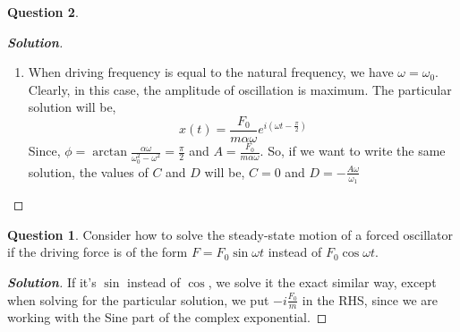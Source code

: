 \documentclass[10pt]{scrartcl}
\theoremstyle{definition}
\newtheorem{exercise}{Question}
\newenvironment{solution} {\begin{proof}[\normalfont \textbf{Solution}]} {\end{proof}}
\begin{document}
\begin{exercise}
\begin{solution}
\begin{enumerate}[label={(\alph*)}]
                Since the RHS is $\frac{F_0}{m}\cos\omega t$, we take a guess that $x(t)$ is of the form $x = Ae^{i\omega t}$.
                Then, putting this value in the equation we get, 
                \begin{align*}
                    &A[-\omega^2 -i\alpha \omega + \omega_0^2] = \frac{F_0}{m} \\ 
                    \Rightarrow &A = \frac{F_0}{m} \cdot \frac{1}{i\alpha\omega + (\omega_0^2 - \omega^2)} \\ 
                    \Rightarrow &A = \frac{F_0}{m} \cdot \frac{1}{\sqrt{\alpha^2\omega^2 + (\omega_0^2 - \omega^2)^2} e^{i\phi}}
                \end{align*}
                Where $\phi = \arctan{\left(\frac{\alpha \omega }{\omega_0^2 - \omega^2}\right)}$
                Hence, the solution is
                $$\boxed{x(t) =e^{-\frac{\alpha t}{2}}(C\cos\omega_1t + D\sin\omega_1t) + A\cos{\left(\omega t - \phi\right)}}$$
                Putting the initial values in the problem we get, $\boxed{C = -A\cos\phi}$ and 
                \begin{align*}
                    &-\frac{\alpha}{2}C + \omega_1 D + \omega A \sin \phi = 0 \\ 
                    \Rightarrow &\omega_1D = -A\left(\omega\sin\phi + \frac{\alpha}{2}\cos\phi\right) \\ 
                    \Rightarrow &\boxed{D = -\frac{A}{\omega_1}\left(\omega\sin\phi + \frac{\alpha}{2}\cos\phi\right)}
                \end{align*}
                This determines $x(t)$ uniquely.
            \item When driving frequency is equal to the natural frequency, we have $\omega = \omega_0$. Clearly, in this case, the amplitude of oscillation is maximum. The particular solution will be, 
                $$\boxed{x(t) = \frac{F_0}{m \alpha \omega} e^{i(\omega t - \frac{\pi}{2})}}$$
                Since, $\phi = \arctan{\frac{\alpha \omega}{\omega_0^2 - \omega^2}}=\frac{\pi}{2}$ and $A = \frac{F_0}{m\alpha\omega}$. So, if we want to write the same solution,
                the values of $C$ and $D$ will be, $\boxed{C = 0}$ and $\boxed{D = -\frac{A\omega}{\omega_1}}$
            \end{enumerate}
    \end{solution}
    \begin{exercise}
        Consider how to solve the steady-state motion of a forced oscillator if the driving force is of 
        the form $F = F_0 \sin \omega t$ instead of $F_0 \cos \omega t$.
    \end{exercise}
    \begin{solution}
        If it's $\sin$ instead of $\cos$, we solve it the exact similar way, except when solving for the particular solution, we
        put $-i \frac{F_0}{m}$ in the RHS, since we are working with the Sine part of the complex exponential.


\end{solution}
\end{exercise}
\end{document}
